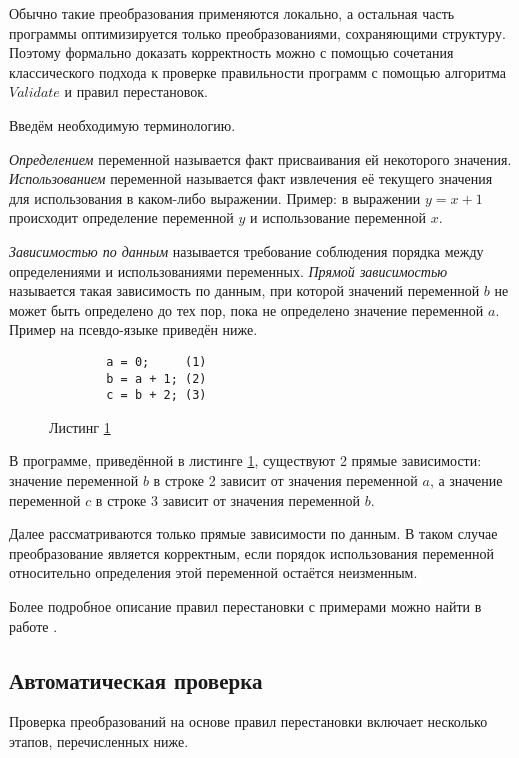 Обычно такие преобразования применяются локально, а остальная часть программы оптимизируется только преобразованиями, сохраняющими структуру. Поэтому формально доказать корректность можно с помощью сочетания классического подхода к проверке правильности программ с помощью алгоритма $Validate$ и правил перестановок.

Введём необходимую терминологию.

\label{def-use}
\emph{Определением} переменной называется факт присваивания ей некоторого значения. \emph{Использованием} переменной называется факт извлечения её текущего значения для использования в каком-либо выражении. Пример: в выражении $y = x + 1$ происходит определение переменной $y$ и использование переменной $x$.

\emph{Зависимостью по данным} называется требование соблюдения порядка между определениями и использованиями переменных.
\emph{Прямой зависимостью} называется такая зависимость по данным, при которой значений переменной $b$ не может быть определено до тех пор, пока не определено значение переменной $a$. Пример на псевдо-языке приведён ниже.

\begin{figure}[!Hb]
    \label{fig:direct-dependency}
    \begin{verbatim}
        a = 0;     (1)
        b = a + 1; (2)
        c = b + 2; (3)
    \end{verbatim}
    Листинг \ref{fig:direct-dependency}
\end{figure}

В программе, приведённой в листинге \ref{fig:direct-dependency}, существуют 2 прямые зависимости: значение переменной $b$ в строке 2 зависит от значения переменной $a$, а значение переменной $c$ в строке 3 зависит от значения переменной $b$.

Далее рассматриваются только прямые зависимости по данным. В таком случае преобразование является корректным, если порядок использования переменной относительно определения этой переменной остаётся неизменным.

Более подробное описание правил перестановки с примерами можно найти в работе \cite{ZuckPFGH02}.

\subsection{Автоматическая проверка}

Проверка преобразований на основе правил перестановки включает несколько этапов, перечисленных ниже.

